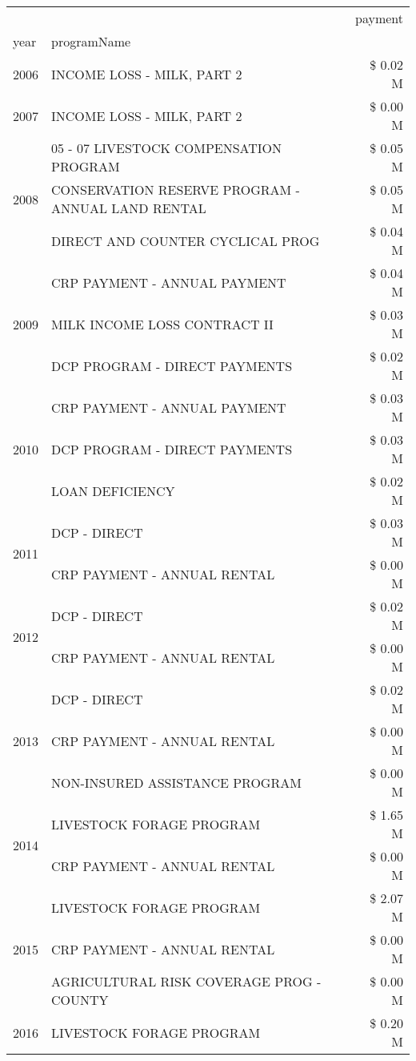 \begin{tabular}{llr}
\toprule
 &  & payment \\
year & programName &  \\
\midrule
2006 & INCOME LOSS - MILK, PART 2 & \$ 0.02 M \\
\cline{1-3}
2007 & INCOME LOSS - MILK, PART 2 & \$ 0.00 M \\
\cline{1-3}
\multirow[t]{3}{*}{2008} & 05 - 07 LIVESTOCK COMPENSATION PROGRAM & \$ 0.05 M \\
 & CONSERVATION RESERVE PROGRAM - ANNUAL LAND RENTAL & \$ 0.05 M \\
 & DIRECT AND COUNTER CYCLICAL PROG & \$ 0.04 M \\
\cline{1-3}
\multirow[t]{3}{*}{2009} & CRP PAYMENT - ANNUAL PAYMENT & \$ 0.04 M \\
 & MILK INCOME LOSS CONTRACT II & \$ 0.03 M \\
 & DCP PROGRAM - DIRECT PAYMENTS & \$ 0.02 M \\
\cline{1-3}
\multirow[t]{3}{*}{2010} & CRP PAYMENT - ANNUAL PAYMENT & \$ 0.03 M \\
 & DCP PROGRAM - DIRECT PAYMENTS & \$ 0.03 M \\
 & LOAN DEFICIENCY & \$ 0.02 M \\
\cline{1-3}
\multirow[t]{2}{*}{2011} & DCP - DIRECT & \$ 0.03 M \\
 & CRP PAYMENT - ANNUAL RENTAL & \$ 0.00 M \\
\cline{1-3}
\multirow[t]{2}{*}{2012} & DCP - DIRECT & \$ 0.02 M \\
 & CRP PAYMENT - ANNUAL RENTAL & \$ 0.00 M \\
\cline{1-3}
\multirow[t]{3}{*}{2013} & DCP - DIRECT & \$ 0.02 M \\
 & CRP PAYMENT - ANNUAL RENTAL & \$ 0.00 M \\
 & NON-INSURED ASSISTANCE PROGRAM & \$ 0.00 M \\
\cline{1-3}
\multirow[t]{2}{*}{2014} & LIVESTOCK FORAGE PROGRAM & \$ 1.65 M \\
 & CRP PAYMENT - ANNUAL RENTAL & \$ 0.00 M \\
\cline{1-3}
\multirow[t]{3}{*}{2015} & LIVESTOCK FORAGE PROGRAM & \$ 2.07 M \\
 & CRP PAYMENT - ANNUAL RENTAL & \$ 0.00 M \\
 & AGRICULTURAL RISK COVERAGE PROG - COUNTY & \$ 0.00 M \\
\cline{1-3}
\multirow[t]{3}{*}{2016} & LIVESTOCK FORAGE PROGRAM & \$ 0.20 M \\

\end{tabular}
